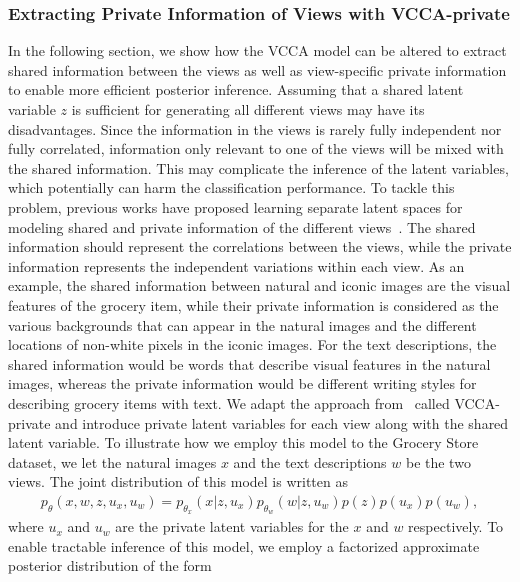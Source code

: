 \subsubsection{Extracting Private Information of Views with VCCA-private}
\label{paperB:sec:extracting_private_information}

In the following section, %
we show how the VCCA model can be altered to extract shared information between the views as well as view-specific private information to enable more efficient posterior inference.
Assuming that a shared latent variable $z$ is sufficient for generating all different views may have its disadvantages. Since the information in the views is rarely fully independent nor fully correlated, information only relevant to one of the views will be mixed with the shared information. This may complicate the inference of the latent variables, which potentially can harm the classification performance. To tackle this problem, previous works have proposed learning separate latent spaces for modeling shared and private information of the different views~. The shared information should represent the correlations between the views, while the private information represents the independent variations within each view. 
As an example, 
the shared information between natural and iconic images are the visual features of the grocery item, while their private information is considered as the various backgrounds that can appear in the natural images and the different locations of non-white pixels in the iconic images. For the text descriptions, the shared information would be words that describe visual features in the natural images, whereas the private information would be different writing styles for describing grocery items with text.   
We adapt the approach from~ called VCCA-private and introduce private latent variables for each view along with the shared latent variable.
To illustrate how we employ this model to the Grocery Store dataset, we let the natural images $x$ and the text descriptions $w$ be the two views. The joint distribution of this model is written as 
\begin{align}
    p_{\theta}(x, w, z, u_{x}, u_{w}) = p_{\theta_{x}}(x | z, u_{x}) p_{\theta_{w}}(w | z, u_{w}) p(z) p(u_{x}) p(u_{w}) ,
\end{align}
where $u_{x}$ and $u_{w}$ are the private latent variables for the $x$ and $w$ respectively. To enable tractable inference of this model, we employ a factorized approximate posterior distribution of the form
